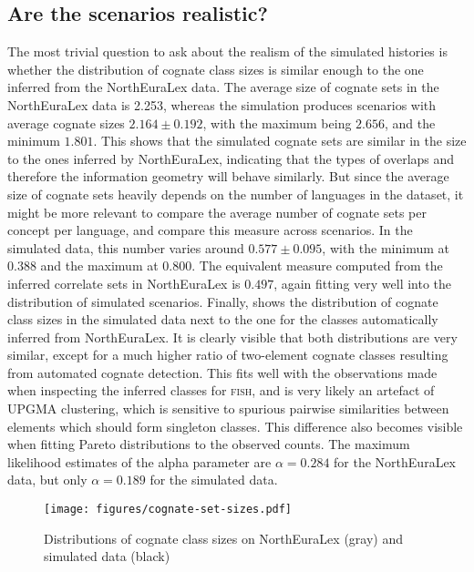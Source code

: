 \subsection{Are the scenarios realistic?}
The most trivial question to ask about the realism of the simulated histories is whether the distribution of cognate class sizes is similar enough to the one inferred from the NorthEuraLex data. The average size of cognate sets in the NorthEuraLex data is 2.253, whereas the simulation produces scenarios with average cognate sizes $2.164 \pm 0.192$, with the maximum being $2.656$, and the minimum $1.801$. This shows that the simulated cognate sets are similar in the size to the ones inferred by NorthEuraLex, indicating that the types of overlaps and therefore the information geometry will behave similarly. But since the average size of cognate sets heavily depends on the number of languages in the dataset, it might be more relevant to compare the average number of cognate sets per concept per language, and compare this measure across scenarios. In the simulated data, this number varies around $0.577 \pm 0.095$, with the minimum at $0.388$ and the maximum at $0.800$. The equivalent measure computed from the 
inferred correlate sets in NorthEuraLex is $0.497$, again fitting very well into the distribution of simulated scenarios. Finally,  shows the distribution of cognate class sizes in the simulated data next to the one for the classes automatically inferred from NorthEuraLex. It is clearly visible that both distributions are very similar, except for a much higher ratio of two-element cognate classes resulting from automated cognate detection. This fits well with the observations made when inspecting the inferred classes for \textsc{fish}, and is very likely an artefact of UPGMA clustering, which is sensitive to spurious pairwise similarities between elements which should form singleton classes. This difference also becomes visible when fitting Pareto distributions to the observed counts. The maximum likelihood estimates of the alpha parameter are $\alpha = 0.284$ for the NorthEuraLex data, but only $\alpha = 0.189$ for the simulated data. 

\begin{figure}
 \begin{center}
 \texttt{[image: figures/cognate-set-sizes.pdf]}
 \caption{Distributions of cognate class sizes on NorthEuraLex (gray) and simulated data (black)}
 \label{cognate-class-sizes}
 \end{center}
\end{figure}

